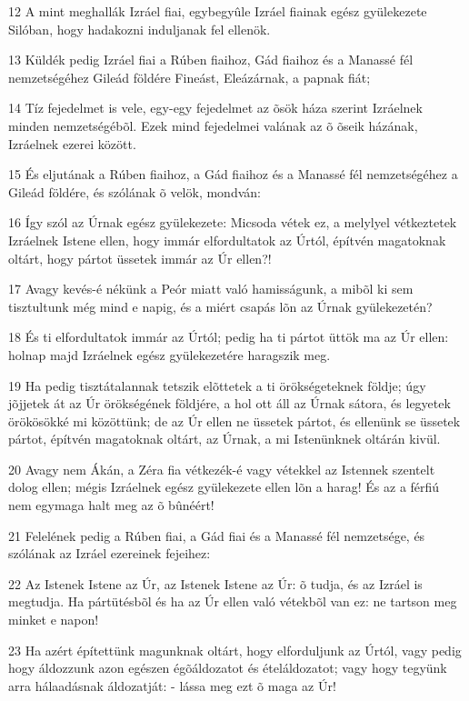 \par 12 A mint meghallák Izráel fiai, egybegyûle Izráel fiainak egész gyülekezete Silóban, hogy hadakozni induljanak fel ellenök.
\par 13 Küldék pedig Izráel fiai a Rúben fiaihoz, Gád fiaihoz és a Manassé fél nemzetségéhez Gileád földére Fineást, Eleázárnak, a papnak fiát;
\par 14 Tíz fejedelmet is vele, egy-egy fejedelmet az õsök háza szerint Izráelnek minden nemzetségébõl. Ezek mind fejedelmei valának az õ õseik házának, Izráelnek ezerei között.
\par 15 És eljutának a Rúben fiaihoz, a Gád fiaihoz és a Manassé fél nemzetségéhez a Gileád földére, és szólának õ velök, mondván:
\par 16 Így szól az Úrnak egész gyülekezete: Micsoda vétek ez, a melylyel vétkeztetek Izráelnek Istene ellen, hogy immár elfordultatok az Úrtól, építvén magatoknak oltárt, hogy pártot üssetek immár az Úr ellen?!
\par 17 Avagy kevés-é nékünk a Peór miatt való hamisságunk, a mibõl ki sem tisztultunk még mind e napig, és a miért csapás lõn az Úrnak gyülekezetén?
\par 18 És ti elfordultatok immár az Úrtól; pedig ha ti pártot üttök ma az Úr ellen: holnap majd Izráelnek egész gyülekezetére haragszik meg.
\par 19 Ha pedig tisztátalannak tetszik elõttetek a ti örökségeteknek földje; úgy jõjjetek át az Úr örökségének földjére, a hol ott áll az Úrnak sátora, és legyetek örökösökké mi közöttünk; de az Úr ellen ne üssetek pártot, és ellenünk se üssetek pártot, építvén magatoknak oltárt, az Úrnak, a mi Istenünknek oltárán kivül.
\par 20 Avagy nem Ákán, a Zéra fia vétkezék-é vagy vétekkel az Istennek szentelt dolog ellen; mégis Izráelnek egész gyülekezete ellen lõn a harag! És az a férfiú nem egymaga halt meg az õ bûnéért!
\par 21 Felelének pedig a Rúben fiai, a Gád fiai és a Manassé fél nemzetsége, és szólának az Izráel ezereinek fejeihez:
\par 22 Az Istenek Istene az Úr, az Istenek Istene az Úr: õ tudja, és az Izráel is megtudja. Ha pártütésbõl és ha az Úr ellen való vétekbõl van ez: ne tartson meg minket e napon!
\par 23 Ha azért építettünk magunknak oltárt, hogy elforduljunk az Úrtól, vagy pedig hogy áldozzunk azon egészen égõáldozatot és ételáldozatot; vagy hogy tegyünk arra hálaadásnak áldozatját: - lássa meg ezt õ maga az Úr!
